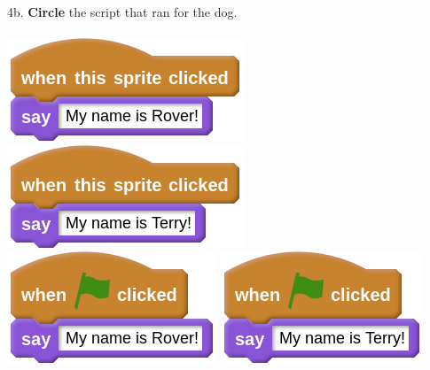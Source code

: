 \documentclass[letterpaper,12pt]{article}
\begin{document}
\noindent 4b. \textbf{Circle} the script that ran for the dog. \\ \\
\includegraphics[scale=.7,valign=t]{q4_script0.png} \hspace{1cm}
\includegraphics[scale=.7,valign=t]{q4_script1.png} \hspace{1cm}
\includegraphics[scale=.7,valign=t]{q4_script2.png} \hspace{1cm}
\includegraphics[scale=.7,valign=t]{q4_script3.png} \hspace{1cm}
\vspace{1cm}

\noindent \dotfill
\end{document}
